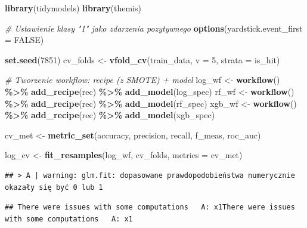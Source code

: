 \documentclass[
]{article}
\newenvironment{Shaded}{\begin{snugshade}}{\end{snugshade}}
\newcommand{\AttributeTok}[1]{\textcolor[rgb]{0.13,0.29,0.53}{#1}}
\newcommand{\CommentTok}[1]{\textcolor[rgb]{0.56,0.35,0.01}{\textit{#1}}}
\newcommand{\ConstantTok}[1]{\textcolor[rgb]{0.56,0.35,0.01}{#1}}
\newcommand{\DecValTok}[1]{\textcolor[rgb]{0.00,0.00,0.81}{#1}}
\newcommand{\FunctionTok}[1]{\textcolor[rgb]{0.13,0.29,0.53}{\textbf{#1}}}
\newcommand{\NormalTok}[1]{#1}
\newcommand{\OtherTok}[1]{\textcolor[rgb]{0.56,0.35,0.01}{#1}}
\newcommand{\SpecialCharTok}[1]{\textcolor[rgb]{0.81,0.36,0.00}{\textbf{#1}}}
\begin{document}
\begin{Shaded}
\begin{Highlighting}[]
\FunctionTok{library}\NormalTok{(tidymodels)}
\FunctionTok{library}\NormalTok{(themis)}

\CommentTok{\# Ustawienie klasy "1" jako zdarzenia pozytywnego}
\FunctionTok{options}\NormalTok{(}\AttributeTok{yardstick.event\_first =} \ConstantTok{FALSE}\NormalTok{)}

\FunctionTok{set.seed}\NormalTok{(}\DecValTok{7851}\NormalTok{)}
\NormalTok{cv\_folds }\OtherTok{\textless{}{-}} \FunctionTok{vfold\_cv}\NormalTok{(train\_data, }\AttributeTok{v =} \DecValTok{5}\NormalTok{, }\AttributeTok{strata =}\NormalTok{ is\_hit)}

\CommentTok{\# Tworzenie workflow: recipe (z SMOTE) + model}
\NormalTok{log\_wf }\OtherTok{\textless{}{-}} \FunctionTok{workflow}\NormalTok{() }\SpecialCharTok{\%\textgreater{}\%} \FunctionTok{add\_recipe}\NormalTok{(rec) }\SpecialCharTok{\%\textgreater{}\%} \FunctionTok{add\_model}\NormalTok{(log\_spec)}
\NormalTok{rf\_wf  }\OtherTok{\textless{}{-}} \FunctionTok{workflow}\NormalTok{() }\SpecialCharTok{\%\textgreater{}\%} \FunctionTok{add\_recipe}\NormalTok{(rec) }\SpecialCharTok{\%\textgreater{}\%} \FunctionTok{add\_model}\NormalTok{(rf\_spec)}
\NormalTok{xgb\_wf }\OtherTok{\textless{}{-}} \FunctionTok{workflow}\NormalTok{() }\SpecialCharTok{\%\textgreater{}\%} \FunctionTok{add\_recipe}\NormalTok{(rec) }\SpecialCharTok{\%\textgreater{}\%} \FunctionTok{add\_model}\NormalTok{(xgb\_spec)}

\NormalTok{cv\_met }\OtherTok{\textless{}{-}} \FunctionTok{metric\_set}\NormalTok{(accuracy, precision, recall, f\_meas, roc\_auc)}

\NormalTok{log\_cv }\OtherTok{\textless{}{-}} \FunctionTok{fit\_resamples}\NormalTok{(log\_wf, cv\_folds, }\AttributeTok{metrics =}\NormalTok{ cv\_met)}
\end{Highlighting}
\end{Shaded}

\begin{verbatim}
## > A | warning: glm.fit: dopasowane prawdopodobieństwa numerycznie okazały się być 0 lub 1
\end{verbatim}

\begin{verbatim}
## There were issues with some computations   A: x1There were issues with some computations   A: x1
\end{verbatim}
\end{document}
